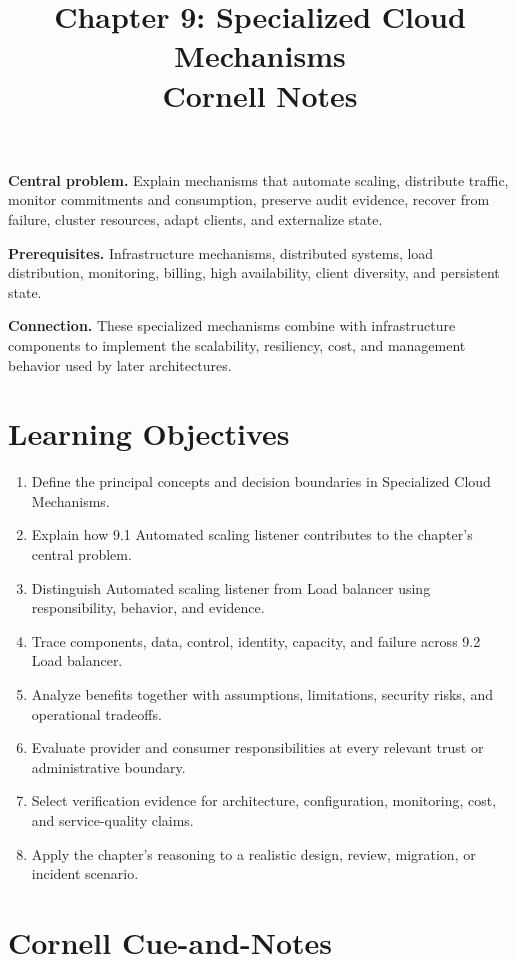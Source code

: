 \documentclass[11pt]{article}
\title{Chapter 9: Specialized Cloud Mechanisms\\[2mm]\large Cornell Notes}
\author{}
\date{}
\begin{document}
\maketitle
\thispagestyle{fancy}
\vspace{-1.5em}
\begin{orientationbox}
\textbf{Central problem.} Explain mechanisms that automate scaling, distribute traffic, monitor commitments and consumption, preserve audit evidence, recover from failure, cluster resources, adapt clients, and externalize state.\par\smallskip
\textbf{Prerequisites.} Infrastructure mechanisms, distributed systems, load distribution, monitoring, billing, high availability, client diversity, and persistent state.\par\smallskip
\textbf{Connection.} These specialized mechanisms combine with infrastructure components to implement the scalability, resiliency, cost, and management behavior used by later architectures.
\end{orientationbox}
\section{Learning Objectives}
\begin{enumerate}
\item Define the principal concepts and decision boundaries in Specialized Cloud Mechanisms.
\item Explain how 9.1 Automated scaling listener contributes to the chapter's central problem.
\item Distinguish Automated scaling listener from Load balancer using responsibility, behavior, and evidence.
\item Trace components, data, control, identity, capacity, and failure across 9.2 Load balancer.
\item Analyze benefits together with assumptions, limitations, security risks, and operational tradeoffs.
\item Evaluate provider and consumer responsibilities at every relevant trust or administrative boundary.
\item Select verification evidence for architecture, configuration, monitoring, cost, and service-quality claims.
\item Apply the chapter's reasoning to a realistic design, review, migration, or incident scenario.
\end{enumerate}
\section{Cornell Cue-and-Notes}
\end{document}
